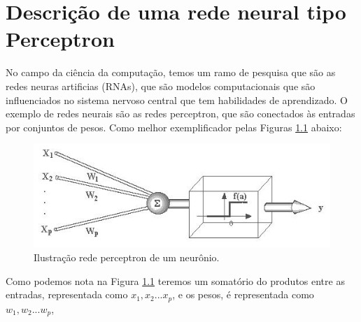  \chapter{ Descrição de uma rede neural tipo Perceptron}

  No campo da ciência da computação, temos um ramo de pesquisa que são as redes neuras artificias (RNAs), que são modelos computacionais que são influenciados no sistema nervoso central que tem habilidades de aprendizado. O exemplo de redes neurais são as redes perceptron, que são conectados às entradas por conjuntos de pesos.  Como melhor exemplificador pelas Figuras \ref{imagens:figura1} abaixo:  
  
  \begin{figure}[h!]
  	\label{imagens:figura1}
  	\centering
  	\includegraphics[width=0.55\linewidth]{imagens/Figura1.jpg}	
  	\caption{Ilustração rede perceptron de um neurônio.}
  \end{figure}
  
  Como podemos nota na Figura \ref{imagens:figura1} teremos um somatório do produtos entre as entradas, representada como $ x_{1}, x_{2} ... x_{p} $, e os pesos, é representada como $ w_{1}, w_{2} ... w_{p} $, %